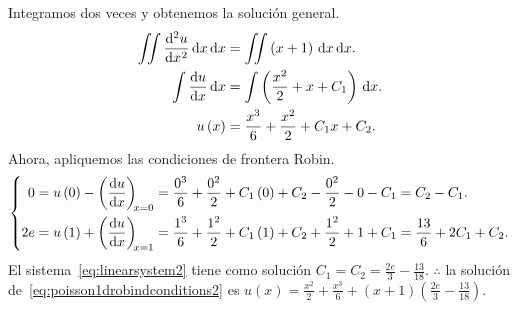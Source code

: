 \begin{solution}
      Integramos dos veces y obtenemos la solución general.
      \begin{align*}
            \iint
            \diff[2]{u}{x}
            \dl x
            \dl x           & =
            \iint
            \left(x+1\right)
            \dl x
            \dl x.              \\
            \int
            \diff{u}{x}
            \dl x           & =
            \int
            \left(\frac{x^{2}}{2}+x+C_{1}\right)
            \dl x.              \\
            u\left(x\right) & =
            \frac{x^{3}}{6}+\frac{x^{2}}{2}+C_{1}x+C_{2}.
      \end{align*}
      Ahora, apliquemos las condiciones de frontera Robin.
      \begin{equation}\label{eq:linearsystem2}
            \left\{
            \begin{aligned}
                  0
                   & =
                  u\left(0\right)-
                  \diff{u}{x}[x=0]=
                  \frac{0^{3}}{6}+\frac{0^{2}}{2}+C_{1}\left(0\right)+C_{2}-
                  \frac{0^{2}}{2}-0-C_{1}=
                  C_{2}-C_{1}. \\
                  2e
                   & =
                  u\left(1\right)+
                  \diff{u}{x}[x=1]=
                  \frac{1^{3}}{6}+\frac{1^{2}}{2}+C_{1}\left(1\right)+C_{2}+
                  \frac{1^{2}}{2}+1+C_{1}=
                  \frac{13}{6}+2C_{1}+C_{2}.
            \end{aligned}
            \right.
      \end{equation}
      El sistema~\eqref{eq:linearsystem2} tiene como solución
      $C_{1}=C_{2}=\frac{2e}{3}-\frac{13}{18}$.
      $\therefore$ la solución
      de~\eqref{eq:poisson1drobindconditions2} es
      \begin{math}
            u\left(x\right)=
            \frac{x^{2}}{2}+\frac{x^{3}}{6}+
            \left(x+1\right)\left(\frac{2e}{3}-\frac{13}{18}\right)
      \end{math}.
      \noQED
\end{solution}

